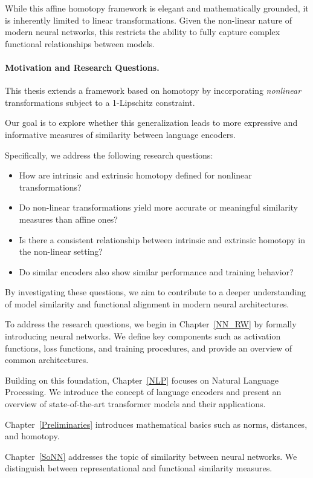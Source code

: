 While this affine homotopy framework is elegant and mathematically grounded, it is inherently limited to linear transformations.  
Given the non-linear nature of modern neural networks, this restricts the ability to fully capture complex functional relationships between models.

\paragraph{Motivation and Research Questions.}
This thesis extends a framework based on homotopy by incorporating 
\emph{non\-linear} transformations subject to a 1-Lipschitz constraint.

 
Our goal is to explore whether this generalization leads to more expressive and informative measures of similarity between language encoders.

Specifically, we address the following research questions:
\begin{itemize}
    \item How are intrinsic and extrinsic homotopy defined for nonlinear transformations?
    \item Do non-linear transformations yield more accurate or meaningful similarity measures than affine ones?
    \item Is there a consistent relationship between intrinsic and extrinsic homotopy in the non-linear setting?
    \item Do similar encoders also show similar performance and training behavior?
\end{itemize}

By investigating these questions, we aim to contribute to a deeper understanding of model similarity and functional alignment in modern neural architectures.

To address the research questions, we begin in Chapter~\ref{NN_RW} by formally introducing neural networks.
We define key components such as activation functions, loss functions, and training procedures, and provide an overview of common architectures.

Building on this foundation, Chapter~\ref{NLP} focuses on Natural Language Processing.
We introduce the concept of language encoders and present an overview of state-of-the-art transformer models and their applications.

Chapter~\ref{Preliminaries} introduces mathematical basics such as norms, distances, and homotopy.

Chapter~\ref{SoNN} addresses the topic of similarity between neural networks.
We distinguish between representational and functional similarity measures.

